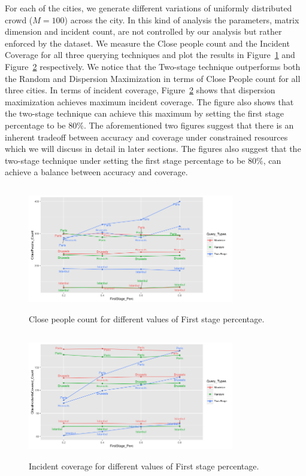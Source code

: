 \documentclass{acm_proc_article-sp}
\begin{document}
For each of the cities, we generate different variations of uniformly distributed crowd ($M = 100$) across the city. In this kind of analysis the parameters, matrix dimension and incident count, are not controlled by our analysis but rather enforced by the dataset. We measure the Close people count and the Incident Coverage for all three querying techniques and plot the results in Figure~\ref{fig: hollaCloseCount} and Figure~\ref{fig: hollaIncCoverage} respectively. We notice that the Two-stage technique outperforms both the Random and Dispersion Maximization in terms of Close People count for all three cities. In terms of incident coverage, Figure~\ref{fig: hollaIncCoverage} shows that dispersion maximization achieves maximum incident coverage. The figure also shows that the two-stage technique can achieve this maximum by setting the first stage percentage to be $80\%$. The aforementioned two figures suggest that there is an inherent tradeoff between accuracy and coverage under constrained resources which we will discuss in detail in later sections. The figures also suggest that the two-stage technique under setting the first stage percentage to be $80\%$, can achieve a balance between accuracy and coverage.



\begin{figure}[!h]
\centering
   \includegraphics[width=9cm ,height=5.5cm]{figuresPng/hollaCloseCnt.png}
   \caption{Close people count for different values of First stage percentage. }
   \label{fig: hollaCloseCount}
\end{figure}
\begin{figure}[!h]
\centering
   \includegraphics[width=9cm ,height=5.5cm]{figuresPng/citiesInc.png}
   \caption{Incident coverage for different values of First stage percentage. }
   \label{fig: hollaIncCoverage}
\end{figure}
\end{document}

